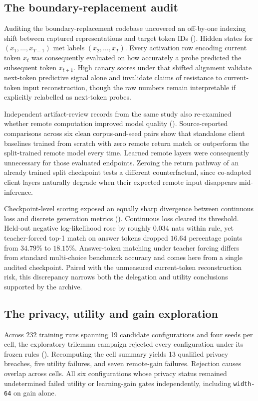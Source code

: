 \subsection{The boundary-replacement audit}
\label{sec:f2}

Auditing the boundary-replacement codebase uncovered an off-by-one indexing
shift between captured representations and target token IDs ().
Hidden states for $(x_1,\ldots,x_{T-1})$ met labels $(x_2,\ldots,x_T)$.
Every activation row encoding current token $x_t$ was consequently evaluated
on how accurately a probe predicted the subsequent token $x_{t+1}$. High
canary scores under that shifted alignment validate next-token predictive
signal alone and invalidate claims of resistance to current-token input
reconstruction, though the raw numbers remain interpretable if explicitly
relabelled as next-token probes.

Independent artifact-review records from the same study also re-examined
whether remote computation improved model quality ().
Source-reported comparisons across six clean corpus-and-seed pairs show
that standalone client baselines trained from scratch with zero remote
return match or outperform the split-trained remote model every time.
Learned remote layers were consequently unnecessary for those evaluated
endpoints. Zeroing the return pathway of an already trained split
checkpoint tests a different counterfactual, since co-adapted client layers
naturally degrade when their expected remote input disappears mid-inference.

Checkpoint-level scoring exposed an equally sharp divergence between
continuous loss and discrete generation metrics (). Continuous
loss cleared its threshold. Held-out negative log-likelihood rose by roughly
$0.034$ nats within rule, yet teacher-forced top-1 match on answer tokens
dropped $16.64$ percentage points from $34.79\%$ to $18.15\%$. Answer-token
matching under teacher forcing differs from standard multi-choice benchmark
accuracy and comes here from a single audited checkpoint. Paired with the
unmeasured current-token reconstruction risk, this discrepancy narrows both
the delegation and utility conclusions supported by the archive.

\subsection{The privacy, utility and gain exploration}
\label{sec:f3}

Across 232 training runs spanning 19 candidate configurations and four
seeds per cell, the exploratory trilemma campaign rejected every
configuration under its frozen rules (). Recomputing the cell
summary yields 13 qualified privacy breaches, five utility failures, and
seven remote-gain failures. Rejection causes overlap across cells. All six
configurations whose privacy status remained undetermined failed utility or
learning-gain gates independently, including \texttt{width-64} on gain
alone.

